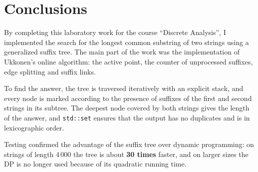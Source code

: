 \section{Conclusions}

By completing this laboratory work for the course \enquote{Discrete Analysis}, I implemented
the search for the longest common substring of two strings using a generalized suffix tree.
The main part of the work was the implementation of Ukkonen's online algorithm: the active point,
the counter of unprocessed suffixes, edge splitting and suffix links.

To find the answer, the tree is traversed iteratively with an explicit stack, and every node is
marked according to the presence of suffixes of the first and second strings in its subtree.
The deepest node covered by both strings gives the length of the answer, and \texttt{std::set}
ensures that the output has no duplicates and is in lexicographic order.

Testing confirmed the advantage of the suffix tree over dynamic programming: on strings of length
4\,000 the tree is about \textbf{30 times} faster, and on larger sizes the DP is no longer used
because of its quadratic running time.

\pagebreak
